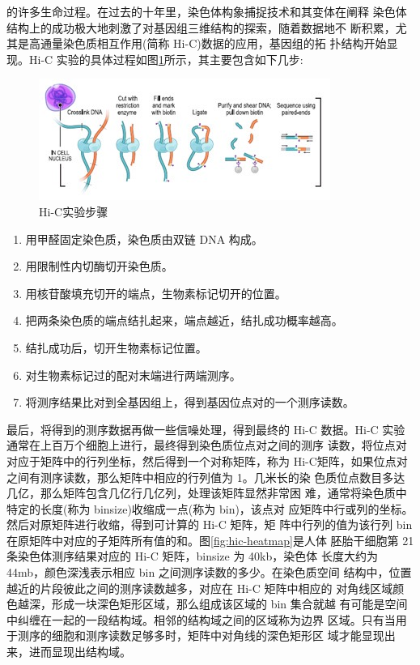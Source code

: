 \documentclass[a4paper]{apa6}
\begin{document}
的许多生命过程。在过去的十年里，染色体构象捕捉技术和其变体在阐释 染色体结构上的成功极大地刺激了对基因组三维结构的探索，随着数据地不 断积累，尤其是高通量染色质相互作用\citep{lieberman2009comprehensive}(简称 Hi-C)数据的应用，基因组的拓 扑结构开始显现。Hi-C 实验的具体过程如图\ref{fig:hic-experiments}所示，其主要包含如下几步:

\begin{figure}[htbp]
\centering
\includegraphics[width=.9\linewidth]{./asset/hic-experiments.jpg}
\caption{\label{fig:hic-experiments}Hi-C实验步骤}
\end{figure}

\begin{enumerate}
\item 用甲醛固定染色质，染色质由双链 DNA 构成。
\item 用限制性内切酶切开染色质。
\item 用核苷酸填充切开的端点，生物素标记切开的位置。
\item 把两条染色质的端点结扎起来，端点越近，结扎成功概率越高。
\item 结扎成功后，切开生物素标记位置。
\item 对生物素标记过的配对末端进行两端测序。
\item 将测序结果比对到全基因组上，得到基因位点对的一个测序读数。
\end{enumerate}

最后，将得到的测序数据再做一些信噪处理\citep{lieberman2009comprehensive}，得到最终的 Hi-C 数据。Hi-C 实验通常在上百万个细胞上进行，最终得到染色质位点对之间的测序
读数，将位点对对应于矩阵中的行列坐标，然后得到一个对称矩阵，称为 Hi-C矩阵，如果位点对之间有测序读数，那么矩阵中相应的行列值为 1。几米长的染 色质位点数目多达几亿，那么矩阵包含几亿行几亿列，处理该矩阵显然非常困 难，通常将染色质中特定的长度(称为 binsize)收缩成一点(称为 bin)，该点对 应矩阵中行或列的坐标。然后对原矩阵进行收缩，得到可计算的 Hi-C 矩阵，矩 阵中行列的值为该行列 bin 在原矩阵中对应的子矩阵所有值的和。图\ref{fig:hic-heatmap}是人体 胚胎干细胞第 21 条染色体测序结果对应的 Hi-C 矩阵，binsize 为 40kb，染色体 长度大约为 44mb，颜色深浅表示相应 bin 之间测序读数的多少。在染色质空间 结构中，位置越近的片段彼此之间的测序读数越多，对应在 Hi-C 矩阵中相应的 对角线区域颜色越深，形成一块深色矩形区域，那么组成该区域的 bin 集合就越 有可能是空间中纠缠在一起的一段结构域。相邻的结构域之间的区域称为边界 区域。只有当用于测序的细胞和测序读数足够多时，矩阵中对角线的深色矩形区 域才能显现出来，进而显现出结构域。
\end{document}
